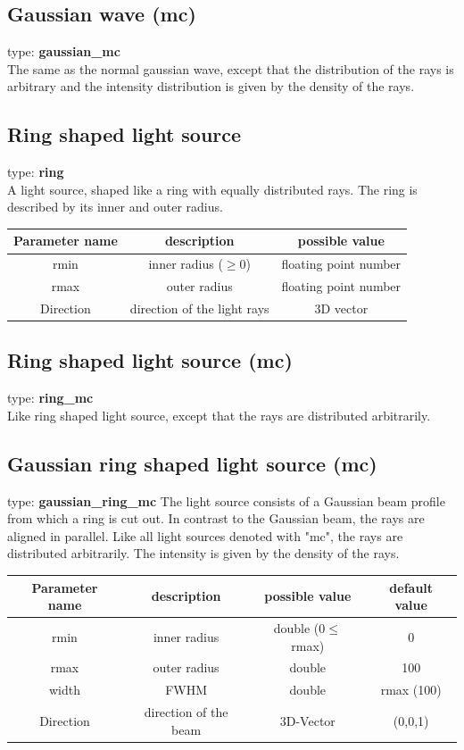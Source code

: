\documentclass[a4paper,html,11pt,openany]{book}
\begin{document}
\subsection{Gaussian wave (mc)} 
 type: \textbf{gaussian\_mc} \\
The same as the normal gaussian wave, except that the distribution of the rays is arbitrary and the intensity distribution is given by the density of the rays. 

\subsection{Ring shaped light source}
type: \textbf{ring} \\
A light source, shaped like a ring with equally distributed rays. The ring is described by its inner and outer radius. 

\vspace{1em}
 \begin{tabular}{c|c|c}
 Parameter name & description  & possible value \\
 \hline
  rmin & inner radius ($\ge 0$) & floating point number \\
  \hline
  rmax & outer radius  & floating point number \\
  \hline 
  Direction & direction of the light rays & 3D vector
\end{tabular} 
 
\subsection{Ring shaped light source (mc)}
 type: \textbf{ring\_mc} \\
Like ring shaped light source, except that the rays are distributed arbitrarily. 
 \subsection{Gaussian ring shaped light source (mc)}
type: \textbf{gaussian\_ring\_mc}
The light source consists of a Gaussian beam profile from which a ring is cut out. In contrast to the Gaussian beam, the rays are aligned in parallel.
Like all light sources denoted with "mc", the rays are distributed arbitrarily. The intensity is given by the density of the rays. 

\vspace{1em}
 \begin{tabular}{c|c|c|c}
 Parameter name & description  & possible value & default value\\
 \hline
 rmin  & inner radius & double ($0\le$ rmax) & 0 \\
 \hline 
 rmax & outer radius & double & 100 \\
 \hline 
 width & FWHM & double & rmax (100) \\
 \hline
 Direction & direction of the beam & 3D-Vector & (0,0,1) \\ 
\end{tabular}
 
\end{document}
